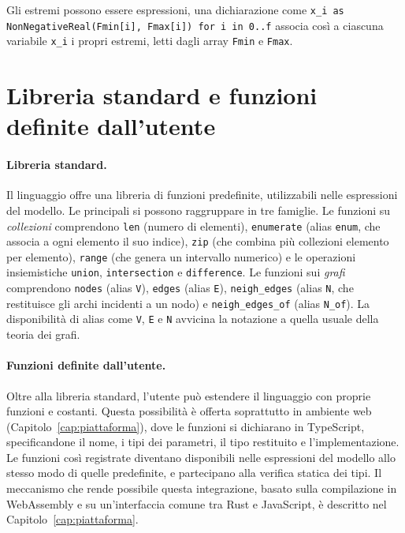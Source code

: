 Gli estremi possono essere espressioni, una dichiarazione come \texttt{x\_i as
NonNegativeReal(Fmin[i], Fmax[i]) for i in 0..f} associa così a ciascuna
variabile \texttt{x\_i} i propri estremi, letti dagli array \texttt{Fmin} e
\texttt{Fmax}.

\section{Libreria standard e funzioni definite dall'utente}
\label{sec:funzioni}

\paragraph{Libreria standard.}
Il linguaggio offre una libreria di funzioni predefinite, utilizzabili nelle
espressioni del modello. Le principali si possono raggruppare in tre famiglie.
Le funzioni su \emph{collezioni} comprendono \texttt{len} (numero di elementi),
\texttt{enumerate} (alias \texttt{enum}, che associa a ogni elemento il suo
indice), \texttt{zip} (che combina più collezioni elemento per elemento),
\texttt{range} (che genera un intervallo numerico) e le operazioni insiemistiche
\texttt{union}, \texttt{intersection} e \texttt{difference}. Le funzioni sui
\emph{grafi} comprendono \texttt{nodes} (alias \texttt{V}), \texttt{edges}
(alias \texttt{E}), \texttt{neigh\_edges} (alias \texttt{N}, che restituisce gli
archi incidenti a un nodo) e \texttt{neigh\_edges\_of} (alias \texttt{N\_of}).
La disponibilità di alias come \texttt{V}, \texttt{E} e \texttt{N} avvicina la
notazione a quella usuale della teoria dei grafi.

\paragraph{Funzioni definite dall'utente.}
Oltre alla libreria standard, l'utente può estendere il linguaggio con proprie
funzioni e costanti. Questa possibilità è offerta soprattutto in ambiente web
(Capitolo~\ref{cap:piattaforma}), dove le funzioni si dichiarano in TypeScript, specificandone il nome, i tipi dei
parametri, il tipo restituito e l'implementazione. Le funzioni così registrate
diventano disponibili nelle espressioni del modello allo stesso modo di quelle
predefinite, e partecipano alla verifica statica dei tipi. Il meccanismo che
rende possibile questa integrazione, basato sulla compilazione in WebAssembly e
su un'interfaccia comune tra Rust e JavaScript, è descritto nel
Capitolo~\ref{cap:piattaforma}.
